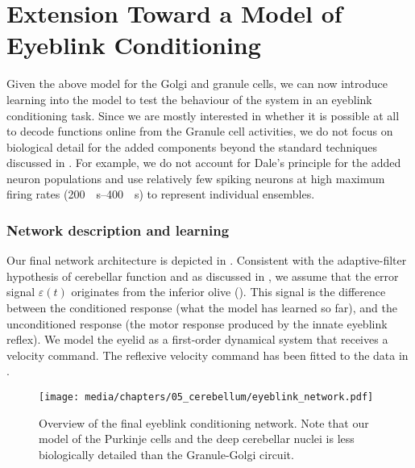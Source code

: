 
\section{Extension Toward a Model of Eyeblink Conditioning}
\label{sec:cerebellum_eyeblink}

Given the above model for the Golgi and granule cells, we can now introduce learning into the model to test the behaviour of the system in an eyeblink conditioning task.
Since we are mostly interested in whether it is possible at all to decode functions online from the Granule cell activities, we do not focus on biological detail for the added components beyond the standard \NEF techniques discussed in .
For example, we do not account for Dale's principle for the added neuron populations and use relatively few spiking neurons at high maximum firing rates (\SIrange{200}{400}{\per\second}) to represent individual ensembles.

\subsubsection{Network description and learning}
Our final network architecture is depicted in .
Consistent with the adaptive-filter hypothesis of cerebellar function and as discussed in , we assume that the error signal $\varepsilon(t)$ originates from the inferior olive (\IO).
This signal is the difference between the conditioned response (what the model has learned so far), and the unconditioned response (the motor response produced by the innate eyeblink reflex).
We model the eyelid as a first-order dynamical system that receives a velocity command.
The reflexive velocity command has been fitted to the \UR data in \citet{heiney2014cerebellardependent}.

\begin{figure}
	\centering%
	\texttt{[image: media/chapters/05\_cerebellum/eyeblink\_network.pdf]}
	\caption[Overview of the final eyeblink conditioning network]{Overview of the final eyeblink conditioning network. Note that our model of the Purkinje cells and the deep cerebellar nuclei is less biologically detailed than the Granule-Golgi circuit.
	}
	\label{fig:eyeblink_network}
\end{figure}

